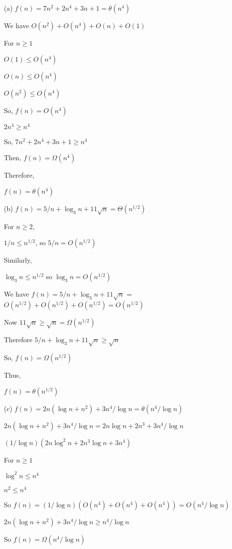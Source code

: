 \documentclass{article}
\begin{document}
\begin{solution}
\begin{description}
\item{(a)} $f(n) = 7n^2 + 2n^4 + 3n + 1 = \theta(n^4)$

We have $O(n^2) + O(n^4) + O(n) + O(1)$

For $n \ge 1$

$O(1) \le O(n^4)$

$O(n) \le O(n^4)$

$O(n^2) \le O(n^4)$

So, $f(n) = O(n^4)$

$2n^4 \ge n^4$

So, $7n^2 + 2n^4 + 3n + 1 \ge n^4$

Then, $f(n) = \Omega(n^4)$

Therefore, 

$f(n) = \theta(n^4)$

\item{(b)} $f(n) = 5/n + \log_3 n + 11\sqrt{n} = \Theta(n^{1/2})$

For $n \ge 2$, 

$1/n \le n^{1/2}$, so $5/n = O(n^{1/2})$


Similarly, 

$\log_3 n \le n^{1/2}$ so $\log_3 n = O(n^{1/2})$

We have $f(n) = 5/n + \log_3 n + 11\sqrt{n}$ = $O(n^{1/2}) + O(n^{1/2}) + O(n^{1/2}) = O(n^{1/2})$

Now $11\sqrt{n} \ge \sqrt{n} = \Omega(n^{1/2})$

Therefore $5/n + \log_3 n + 11\sqrt{n} \ge \sqrt{n}$

So, $f(n) = \Omega(n^{1/2})$

Thus, 

$f(n) = \theta(n^{1/2})$

\item{(c)} $f(n) = 2n ( \log n + n^2) + 3n^4/\log n = \theta(n^4/\log n)$

$2n ( \log n + n^2) + 3n^4/\log n = 2n\log n + 2n^3 + 3n^4/\log n$

$(1/\log n)(2n\log^2 n + 2n^3\log n + 3n^4)$

For $n \ge 1$

$\log^2 n \le n^4$

$n^2 \le n^4$

So $f(n) = (1/\log n)(O(n^4) + O(n^4) + O(n^4)) = O(n^4/\log n)$

$2n ( \log n + n^2) + 3n^4/\log n \ge n^4/\log n$

So $f(n) = \Omega(n^4/\log n)$


\end{description}
\end{solution}
\end{document}
